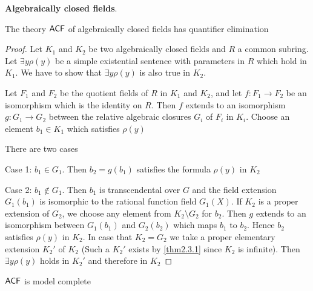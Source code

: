 \documentclass[11pt]{article}
\begin{document}
\textbf{Algebraically closed fields}.
\begin{theorem}[Tarski]
The theory \(\operatorname{\textsf{ACF}}\) of algebraically closed fields has quantifier elimination
\end{theorem}

\begin{proof}
Let \(K_1\) and \(K_2\) be two algebraically closed fields and \(R\) a common
subring. Let \(\exists y\rho(y)\) be a simple existential sentence with
parameters in \(R\) which hold in \(K_1\). We have to show that \(\exists y\rho(y)\) is also true in \(K_2\).

Let \(F_1\) and \(F_2\) be the quotient fields of \(R\) in \(K_1\) and
\(K_2\), and let \(f:F_1\to F_2\) be an isomorphism which is the identity on
\(R\). Then \(f\) extends to an isomorphism \(g:G_1\to G_2\) between the
relative algebraic closures \(G_i\) of \(F_i\) in \(K_i\). Choose an element \(b_1\in K_1\) which
satisfies \(\rho(y)\)

\begin{center}\end{center}
There are two cases

Case 1: \(b_1\in G_1\). Then \(b_2=g(b_1)\) satisfies the formula \(\rho(y)\) in \(K_2\)

Case 2: \(b_1\not\in G_1\). Then \(b_1\) is transcendental over \(G\) and the field
extension \(G_1(b_1)\) is isomorphic to the rational function field \(G_1(X)\). If \(K_2\) is a
proper extension of \(G_2\), we choose any element from \(K_2\setminus G_2\) for \(b_2\). Then \(g\) extends
to an isomorphism between \(G_1(b_1)\) and \(G_2(b_2)\) which maps \(b_1\) to \(b_2\). Hence \(b_2\)
satisfies \(\rho(y)\) in \(K_2\). In case that \(K_2=G_2\) we take a proper elementary
extension \(K_2'\) of \(K_2\) (Such a \(K_2'\) exists by \ref{thm2.3.1} since \(K_2\) is infinite).
Then \(\exists y\rho(y)\) holds in \(K_2'\) and therefore in \(K_2\)
\end{proof}

\begin{corollary}[]
\(\textsf{ACF}\) is model complete
\end{corollary}
\end{document}
